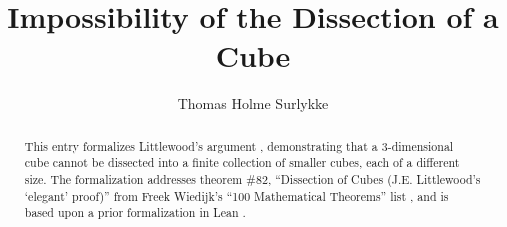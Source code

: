 \documentclass[11pt,a4paper]{article}
\begin{document}
\title{Impossibility of the Dissection of a Cube}
\author{Thomas Holme Surlykke}
\maketitle

\begin{abstract}
This entry formalizes Littlewood's argument \cite{littlewood}, demonstrating that a 3-dimensional cube cannot be dissected into a finite collection of smaller cubes, each of a different size.
The formalization addresses theorem \#82, ``Dissection of Cubes (J.E. Littlewood's `elegant' proof)'' from Freek Wiedijk's ``100 Mathematical Theorems'' list \cite{theorems100}, and is based upon a prior formalization in Lean \cite{leanproof}.
\end{abstract}

\tableofcontents





\end{document}

